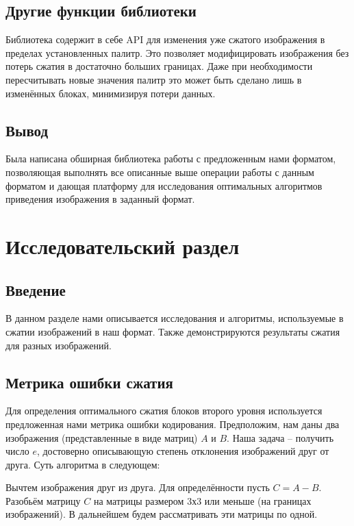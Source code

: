 \documentclass[a4paper,12pt]{article}
\numberwithin{equation}{section}
\begin{document}
\subsection{Другие функции библиотеки}

Библиотека содержит в себе API для изменения уже сжатого изображения в пределах
установленных палитр. Это позволяет модифицировать изображения без потерь сжатия
в достаточно больших границах. Даже при необходимости пересчитывать новые
значения палитр это может быть сделано лишь в изменённых блоках, минимизируя
потери данных.

\subsection{Вывод}

Была написана обширная библиотека работы с предложенным нами форматом,
позволяющая выполнять все описанные выше операции работы с данным форматом и
дающая платформу для исследования оптимальных алгоритмов приведения изображения
в заданный формат.

\section{Исследовательский раздел}

\subsection{Введение}

В данном разделе нами описывается исследования и алгоритмы, используемые в
сжатии изображений в наш формат. Также демонстрируются результаты сжатия для
разных изображений.

\subsection{Метрика ошибки сжатия}

Для определения оптимального сжатия блоков второго уровня используется
предложенная нами метрика ошибки кодирования. Предположим, нам даны два
изображения (представленные в виде матриц) $A$ и $B$. Наша задача -- получить
число $e$, достоверно описывающую степень отклонения изображений друг от
друга. Суть алгоритма в следующем:

Вычтем изображения друг из друга. Для определённости пусть $C = A - B$. Разобьём
матрицу $C$ на матрицы размером 3х3 или меньше (на границах изображений). В
дальнейшем будем рассматривать эти матрицы по одной.
\end{document}
